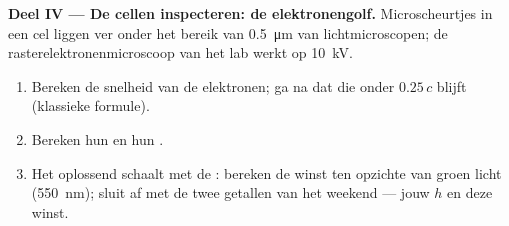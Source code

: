\begin{problem}
\medskip
\noindent\textbf{Deel IV --- De cellen inspecteren: de elektronengolf.}
Microscheurtjes in een cel liggen ver onder het bereik van \qty{0.5}{\micro m}
van lichtmicroscopen; de rasterelektronenmicroscoop van het lab werkt op
\qty{10}{kV}.
\begin{enumerate}[resume]
  \item Bereken de snelheid van de elektronen; ga na dat die onder $0.25\,c$
        blijft (klassieke formule).
  \item Bereken hun  en hun .
  \item Het oplossend  schaalt met de : bereken de winst ten
        opzichte van groen licht (\qty{550}{nm}); sluit af met de twee getallen
        van het weekend --- jouw $h$ en deze winst.
\end{enumerate}
\end{problem}
